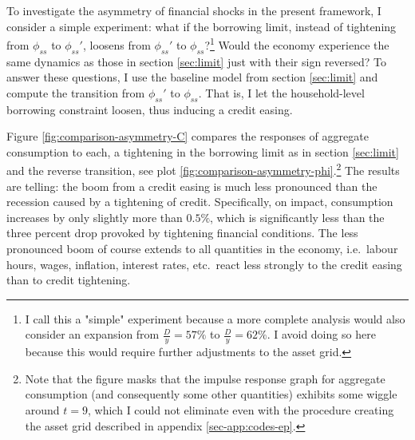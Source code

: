\documentclass[a4paper,12pt]{article} %
\numberwithin{equation}{section} %
\numberwithin{figure}{section}
\numberwithin{table}{section}
\begin{document}
To investigate the asymmetry of financial shocks in the present framework, I consider a simple experiment: what if the borrowing limit, instead of tightening from $\phi_{ss}$ to $\phi_{ss}'$, loosens from $\phi_{ss}'$ to $\phi_{ss}$?\footnote{I call this a "simple" experiment because a more complete analysis would also consider an expansion from $\frac{D}{y} = 57\%$ to $\frac{D}{y} = 62\%$. I avoid doing so here because this would require further adjustments to the asset grid.} Would the economy experience the same dynamics as those in section \ref{sec:limit} just with their sign reversed? To answer these questions, I use the baseline model from section \ref{sec:limit} and compute the transition from $\phi_{ss}'$ to $\phi_{ss}$. That is, I let the household-level borrowing constraint loosen, thus inducing a credit easing. 

Figure \ref{fig:comparison-asymmetry-C} compares the responses of aggregate consumption to each, a tightening in the borrowing limit as in section \ref{sec:limit} and the reverse transition, see  plot \ref{fig:comparison-asymmetry-phi}.\footnote{Note that the figure masks that the impulse response graph for aggregate consumption (and consequently some other quantities) exhibits some wiggle around $t=9$, which I could not eliminate even with the procedure creating the asset grid described in appendix \ref{sec-app:codes-ep}.} The results are telling: the boom from a credit easing is much less pronounced than the recession caused by a tightening of credit. Specifically, on impact, consumption increases by only slightly more than $0.5\%$, which is significantly less than the three percent drop provoked by tightening financial conditions. The less pronounced boom of course extends to all quantities in the economy, i.e.~labour hours, wages, inflation, interest rates, etc.~react less strongly to the credit easing than to credit tightening.
\end{document}
